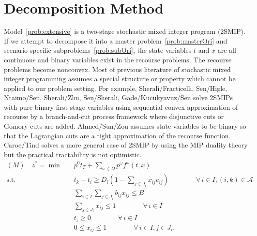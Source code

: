\documentclass[11pt]{article}
\begin{document}
	\section{Decomposition Method} \label{sec:decomposition}
	Model~\eqref{prob:extensive} is a two-stage stochastic mixed integer program (2SMIP). If we attempt to decompose it into a master problem~\eqref{prob:masterOri} and scenario-specific subproblems~\eqref{prob:subOri}, the state variables \(t\) and \(x\) are all continuous and binary variables exist in the recourse problems. The recourse problems become nonconvex. Most of previous literature of stochastic mixed integer programming assumes a special structure or property which cannot be applied to our problem setting. For example, Sherali/Fracticelli, Sen/Higle, Ntaimo/Sen, Sherali/Zhu, Sen/Sherali, Gade/Kucukyavuz/Sen solve 2SMIPs with pure binary first stage variables using sequential convex approximation of recourse by a branch-and-cut process framework where disjunctive cuts or Gomory cuts are added. Ahmed/Sun/Zou assumes state variables to be binary so that the Lagrangian cuts are a tight approximation of the recourse function. Caroe/Tind solves a more general case of 2SMIP by using the MIP duality theory but the practical tractability is not optimistic. 
	\begin{subequations}
		\label{prob:masterOri}
		\begin{align}
		(M) \quad z^* = \min \quad &p^0 t_T + \sum_{\omega \in \Omega} p^\omega f^\omega(t,x)\\
		\text{s.t.} \quad & t_k - t_i \geq D_{i}(1 - \sum_{j \in J_i} x_{ij} e_{ij}) \qquad \qquad \forall \,i \in I, (i,k) \in \mathcal{A} \label{cons:MSep}\\
		& \sum_{i \in I} \sum_{j \in J_i} b_{ij}x_{ij} \leq B  \label{cons:MBudget}\\
		& \sum_{j \in J_i} x_{ij} \leq 1  \qquad \qquad \forall \,i \in I \label{cons:MSingleBudget}\\
		& t_i \geq 0 \qquad \qquad \forall \,i \in I\\
		& 0 \leq x_{ij} \leq 1 \qquad \qquad \forall \,i \in I, j \in J_i.
		\end{align}
	\end{subequations}
\end{document}
